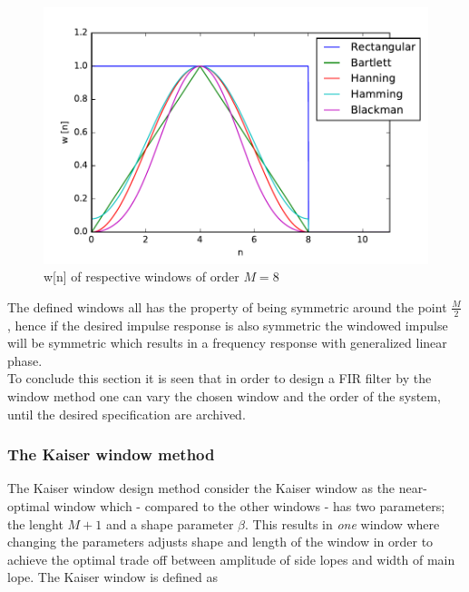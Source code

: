 \begin{figure}[H]
    \centering
    \includegraphics[scale=0.8]{figures/filter_teori/window_types.pdf}
    \caption{w[n] of respective windows of order $M = 8$}
    \label{fig:window_types}
\end{figure}  

The defined windows all has the property of being symmetric around the point $\frac{M}{2}$, hence if the desired impulse response is also symmetric the windowed impulse will be symmetric which results in a frequency response with generalized linear phase. \\
To conclude this section it is seen that in order to design a FIR filter by the window method one can vary the chosen window and the order of the system, until the desired specification are archived. 
\subsubsection{The Kaiser window method}
The Kaiser window design method consider the Kaiser window as the near-optimal window which -  compared to the other windows - has two parameters; the lenght $M+1$ and a shape parameter $\beta$. This results in \textit{one} window where changing the parameters adjusts shape and length of the window in order to achieve the optimal trade off between amplitude of side lopes and width of main lope. The Kaiser window is defined as 


